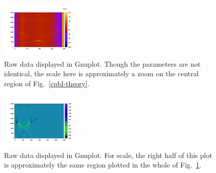 \documentclass[twocolumn]{revtex4}
\newcommand{\figwidth}{0.33\textwidth}
\begin{document}
\begin{figure} 
\includegraphics[width=\figwidth]{colorful-data.png}
\caption{ Raw data displayed in Gnuplot. Though the parameters are not
identical, the scale here is approximately a zoom on the central
region of Fig.~\ref{cpbl-theory}.}
\label{raw-1}
\end{figure}

\begin{figure}
\includegraphics[width=\figwidth]{CPBL-color.png}
\caption{ Raw data displayed in Gnuplot. For scale, the right half of
  this plot is approximately the same region plotted in the whole of
  Fig.~\ref{raw-1}. }
\label{raw-2}
\end{figure}
\end{document}
